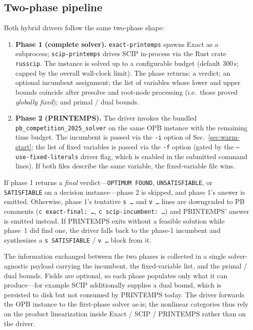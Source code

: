 \documentclass[conference]{IEEEtran}
\begin{document}
\subsection{Two-phase pipeline}
Both hybrid drivers follow the same two-phase shape:
\begin{enumerate}
\item \textbf{Phase 1 (complete solver).} \texttt{exact-printemps} spawns Exact as a subprocess; \texttt{scip-printemps} drives SCIP in-process via the Rust crate \texttt{russcip}. The instance is solved up to a configurable budget (default 300\,s; capped by the overall wall-clock limit). The phase returns: a verdict; an optional incumbent assignment; the list of variables whose lower and upper bounds coincide after presolve and root-node processing (i.e.\ those proved \emph{globally fixed}); and primal / dual bounds.
\item \textbf{Phase 2 (PRINTEMPS).} The driver invokes the bundled \texttt{pb\_competition\_2025\_solver} on the same OPB instance with the remaining time budget. The incumbent is passed via the \texttt{-i} option of Sec.~\ref{sec:warm-start}; the list of fixed variables is passed via the \texttt{-f} option (gated by the \texttt{--use-fixed-literals} driver flag, which is enabled in the submitted command lines). If both files describe the same variable, the fixed-variable file wins.
\end{enumerate}
If phase 1 returns a \emph{final} verdict---\texttt{OPTIMUM FOUND}, \texttt{UNSATISFIABLE}, or \texttt{SATISFIABLE} on a decision instance---phase 2 is skipped, and phase 1's answer is emitted. Otherwise, phase 1's tentative \texttt{s\,\ldots} and \texttt{v\,\ldots} lines are downgraded to PB comments (\texttt{c exact-final:\ \ldots}, \texttt{c scip-incumbent:\ \ldots}) and PRINTEMPS' answer is emitted instead. If PRINTEMPS exits without a feasible solution while phase~1 did find one, the driver falls back to the phase-1 incumbent and synthesizes a \texttt{s SATISFIABLE} / \texttt{v\,\ldots} block from it.

The information exchanged between the two phases is collected in a single solver-agnostic payload carrying the incumbent, the fixed-variable list, and the primal / dual bounds. Fields are optional, so each phase populates only what it can produce---for example SCIP additionally supplies a dual bound, which is persisted to disk but not consumed by PRINTEMPS today. The driver forwards the OPB instance to the first-phase solver as-is; the nonlinear categories thus rely on the product linearization inside Exact / SCIP / PRINTEMPS rather than on the driver.
\end{document}
